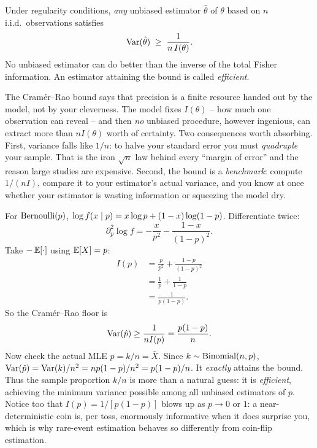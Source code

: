 \begin{theorem}
\label{ch30:thm-crlb}
Under regularity conditions, \emph{any} unbiased estimator $\hat\theta$ of
$\theta$ based on $n$ i.i.d.\ observations satisfies
\[
  \operatorname{Var}(\hat\theta) \;\ge\; \frac{1}{n\,I(\theta)}.
\]
No unbiased estimator can do better than the inverse of the total Fisher
information. An estimator attaining the bound is called \emph{efficient}.
\end{theorem}

\begin{happeningbox}
The Cram\'er--Rao bound says that precision is a finite resource handed out by the
model, not by your cleverness. The model fixes $I(\theta)$ -- how much one
observation can reveal -- and then \emph{no} unbiased procedure, however
ingenious, can extract more than $nI(\theta)$ worth of certainty. Two
consequences worth absorbing. First, variance falls like $1/n$: to halve your
standard error you must \emph{quadruple} your sample. That is the iron $\sqrt n$
law behind every ``margin of error'' and the reason large studies are
expensive. Second, the bound is a \emph{benchmark}: compute $1/(nI)$, compare it
to your estimator's actual variance, and you know at once whether your estimator
is wasting information or squeezing the model dry.
\end{happeningbox}

\begin{example}[The CRLB for a coin, and why $\hat p=k/n$ is efficient]
\label{ch30:ex-crlb-bern}
For $\operatorname{Bernoulli}(p)$, $\log f(x\mid p)=x\log p+(1-x)\log(1-p)$. Differentiate twice:
\[
  \partial_p^2 \log f = -\frac{x}{p^2} - \frac{1-x}{(1-p)^2}.
\]
Take $-\operatorname{\mathbb{E}}[\cdot]$ using $\operatorname{\mathbb{E}}[X]=p$:
\begin{align*}
  I(p) &= \frac{p}{p^2} + \frac{1-p}{(1-p)^2} \\
       &= \frac1p + \frac1{1-p} \\
       &= \frac{1}{p(1-p)}.
\end{align*}
So the Cram\'er--Rao floor is
\[
  \operatorname{Var}(\hat p) \ge \frac{1}{nI(p)} = \frac{p(1-p)}{n}.
\]
Now check the actual MLE $\hat p=k/n=\bar X$. Since $k\sim\operatorname{Binomial}(n,p)$,
$\operatorname{Var}(\hat p) = \operatorname{Var}(k)/n^2 = np(1-p)/n^2 = p(1-p)/n$. It \emph{exactly} attains
the bound. Thus the sample proportion $k/n$ is more than a natural guess: it is
\emph{efficient}, achieving the minimum variance possible among all unbiased estimators of $p$. Notice too that
$I(p)=1/[p(1-p)]$ blows up as $p\to 0$ or $1$: a near-deterministic coin is, per
toss, enormously informative when it does surprise you, which is why rare-event
estimation behaves so differently from coin-flip estimation.
\end{example}

